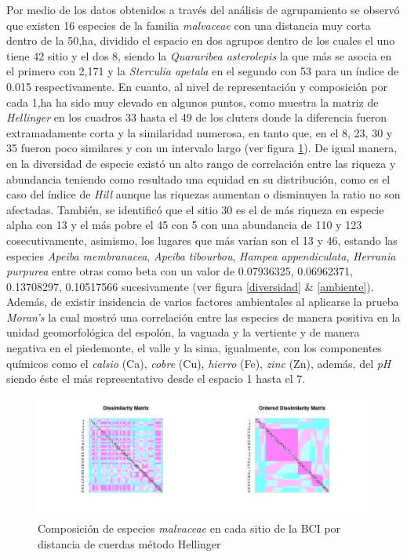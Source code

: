 \documentclass[11pt,]{article}
\begin{document}
Por medio de los datos obtenidos a través del análisis de agrupamiento
se observó que existen 16 especies de la familia \emph{malvaceae} con
una distancia muy corta dentro de la 50,ha, dividido el espacio en dos
agrupos dentro de los cuales el uno tiene 42 sitio y el dos 8, siendo la
\emph{Quararibea asterolepis} la que más se asocia en el primero con
2,171 y la \emph{Sterculia apetala} en el segundo con 53 para un índice
de 0.015 respectivamente. En cuanto, al nivel de representación y
composición por cada 1,ha ha sido muy elevado en algunos puntos, como
muestra la matriz de \emph{Hellinger} en los cuadros 33 hasta el 49 de
los cluters donde la diferencia fueron extramadamente corta y la
similaridad numerosa, en tanto que, en el 8, 23, 30 y 35 fueron poco
similares y con un intervalo largo (ver figura \ref{representacion}). De
igual manera, en la diversidad de especie existó un alto rango de
correlación entre las riqueza y abundancia teniendo como resultado una
equidad en su distribución, como es el caso del índice de \emph{Hill}
aunque las riquezas aumentan o disminuyen la ratio no son afectadas.
También, se identificó que el sitio 30 es el de más riqueza en especie
alpha con 13 y el más pobre el 45 con 5 con una abundancia de 110 y 123
cosecutivamente, asimismo, los lugares que más varían son el 13 y 46,
estando las especies \emph{Apeiba membranacea}, \emph{Apeiba tibourbou},
\emph{Hampea appendiculata}, \emph{Herrania purpurea} entre otras como
beta con un valor de 0.07936325, 0.06962371, 0.13708297, 0.10517566
sucesivamente (ver figura \ref{diversidad} \& \ref{ambiente}). Además,
de existir insidencia de varios factores ambientales al aplicarse la
prueba \emph{Moran's} la cual mostró una correlación entre las especies
de manera positiva en la unidad geomorfológica del espolón, la vaguada y
la vertiente y de manera negativa en el piedemonte, el valle y la sima,
igualmente, con los componentes químicos como el \emph{calsio} (Ca),
\emph{cobre} (Cu), \emph{hierro} (Fe), \emph{zinc} (Zn), además, del
\emph{pH} siendo éste el más representativo desde el espacio 1 hasta el
7.

\begin{figure}
\centering
\includegraphics[width=1.00000\textwidth]{disimilaridad_Hellinger.png}
\caption{Composición de especies \emph{malvaceae} en cada sitio de la
BCI por distancia de cuerdas método Hellinger\label{representacion}}
\end{figure}
\end{document}
